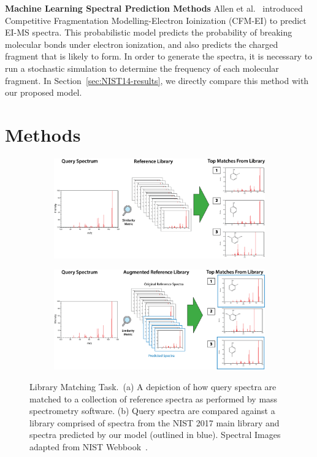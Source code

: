 \documentclass{article}
\begin{document}
\textbf{Machine Learning Spectral Prediction Methods} Allen et al.~\cite{allen2016computational} introduced Competitive Fragmentation Modelling-Electron Ioinization (CFM-EI) to predict EI-MS spectra. This probabilistic model predicts the probability of breaking molecular bonds under electron ionization, and also predicts the charged fragment that is likely to form. In order to generate the spectra, it is necessary to run a stochastic simulation to determine the frequency of each molecular fragment.
In Section~\ref{sec:NIST14-results}, we directly compare this method with our proposed model.




\section{Methods}


\begin{figure}[ht]
    \centering
    \begin{subfigure}{0.9\textwidth}
        \includegraphics[width=\textwidth]{./lib_match_baseline.png}
        \caption{}
    \end{subfigure}
    \begin{subfigure}{0.9\textwidth}
        \includegraphics[width=\textwidth]{./lib_match_predicted.png}
        \caption{}
    \end{subfigure}
    \caption[Library Matching Task]{Library Matching Task.~(a) A depiction of how query spectra are matched to a collection of reference spectra as performed by mass spectrometry software. (b) Query spectra are compared against a library comprised of spectra from the NIST 2017 main library and spectra predicted by our model (outlined in blue).  Spectral Images adapted from NIST Webbook~\cite{NIST_WebBook}.}
    \label{fig:library_matching}
\end{figure}
\end{document}
